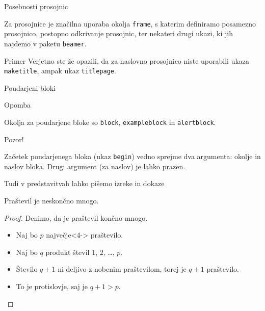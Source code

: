 \begin{frame}{Posebnosti prosojnic}

	Za prosojnice je značilna uporaba okolja \texttt{frame},
	s katerim definiramo posamezno prosojnico,\pause
	postopno odkrivanje prosojnic,\pause
	ter nekateri drugi ukazi, ki jih najdemo v paketu \texttt{beamer}.\pause
	\begin{exampleblock}{Primer}
		Verjetno ste že opazili, da za naslovno prosojnico niste uporabili
		ukaza \texttt{maketitle}, ampak ukaz \texttt{titlepage}.
	\end{exampleblock}
\end{frame}

\begin{frame}{Poudarjeni bloki}
        \begin{block}{Opomba}
		\end{block}
		Okolja za poudarjene bloke so \texttt{block}, \texttt{exampleblock} in \texttt{alertblock}.
        \begin{alertblock}{Pozor!}
		\end{alertblock}
		Začetek poudarjenega bloka (ukaz \texttt{begin}) vedno sprejme 
		dva argumenta: okolje in naslov bloka.
		Drugi argument (za naslov) je lahko prazen. 

\end{frame}

\begin{frame}{Tudi v predstavitvah lahko pišemo izreke in dokaze}

	\begin{izrek}
	   Praštevil je neskončno mnogo.
	\end{izrek}
	\begin{proof}
	   Denimo, da je praštevil končno mnogo.
	   \begin{itemize}
		  \item<1-> Naj bo \(p\) \alert{največje}<4-> praštevilo.
		  \item<2-> Naj bo \(q\) produkt števil \(1\), \(2\), \ldots, \(p\).
		  \item<3-> Število \(q+1\) ni deljivo z nobenim praštevilom, torej je \(q+1\) praštevilo.
		  \item<4-> To je protislovje, saj je \(q+1>p\). \qedhere
	   \end{itemize}
	\end{proof}
 \end{frame}
 
